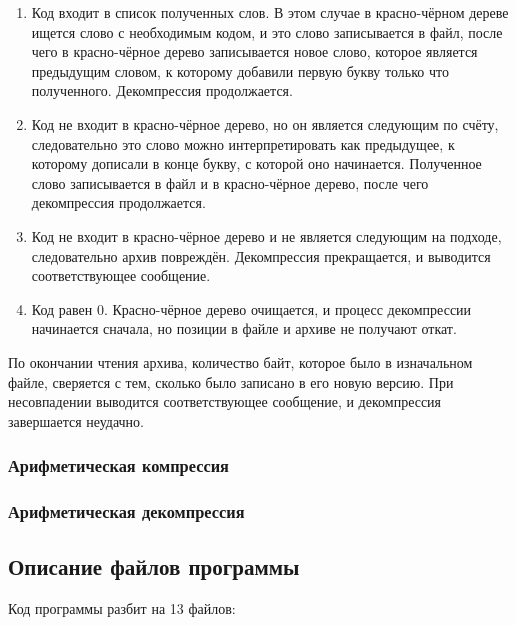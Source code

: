 \documentclass[12pt]{article}
\begin{document}
\begin{enumerate}
	\item Код входит в список полученных слов. В этом случае в красно-чёрном дереве ищется слово с необходимым кодом, и это слово записывается в файл, после чего в красно-чёрное дерево записывается новое слово, которое является предыдущим словом, к которому добавили первую букву только что полученного. Декомпрессия продолжается.
	\item Код не входит в красно-чёрное дерево, но он является следующим по счёту, следовательно это слово можно интерпретировать как предыдущее, к которому дописали в конце букву, с которой оно начинается. Полученное слово записывается в файл и в красно-чёрное дерево, после чего декомпрессия продолжается.
	\item Код не входит в красно-чёрное дерево и не является следующим на подходе, следовательно архив повреждён. Декомпрессия прекращается, и выводится соответствующее сообщение.
	\item Код равен $0$. Красно-чёрное дерево очищается, и процесс декомпрессии начинается сначала, но позиции в файле и архиве не получают откат.
\end{enumerate}

По окончании чтения архива, количество байт, которое было в изначальном файле, сверяется с тем, сколько было записано в его новую версию. При несовпадении выводится соответствующее сообщение, и декомпрессия завершается неудачно.


\subsubsection*{Арифметическая компрессия}

\subsubsection*{Арифметическая декомпрессия}

\subsection*{Описание файлов программы}

Код программы разбит на 13 файлов:
\end{document}
